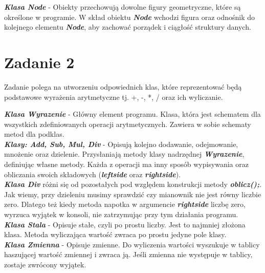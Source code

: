 \documentclass[12pt]{article}
\begin{document}
\textbf{\textit{Klasa Node}} -
Obiekty przechowują dowolne figury geometryczne, które są określone w programie. W skład obiektu \textbf{\textit{Node}} wchodzi figura oraz odnośnik do kolejnego elementu \textbf{\textit{Node}}, aby zachować porządek i ciągłość struktury danych.
\newpage

\section{Zadanie 2}
	
Zadanie polega na utworzeniu odpowiednich klas, które reprezentować będą podstawowe wyrażenia arytmetyczne tj. +, -, *, / oraz ich wyliczanie.


\textbf{\textit{Klasa Wyrazenie}} -
Główny element programu. Klasa, która jest schematem dla wszystkich zdefiniowanych operacji arytmetycznych. Zawiera w sobie schematy metod dla podklas.\\

\textbf{\textit{Klasy: Add, Sub, Mul, Div}} - Opisują kolejno dodawanie, odejmowanie, mnożenie oraz dzielenie. Przysłaniają metody klasy nadrzędnej \textbf{\textit{Wyrazenie}}, definiując własne metody. Każda z operacji ma inny sposób wypisywania oraz obliczania swoich składowych (\textbf{\textit{\textunderscore leftside}} oraz \textbf{\textit{\textunderscore rightside}}). \\

\textbf{\textit{Klasa Div}} różni się od pozostałych pod względem konstrukcji metody \textbf{\textit{oblicz();}}. Jak wiemy, przy dzieleniu musimy sprawdzić czy mianownik nie jest równy liczbie zero. Dlatego też kiedy metoda napotka w argumencie \textbf{\textit{\textunderscore rightside}} liczbę zero, wyrzuca wyjątek w konsoli, nie zatrzymując przy tym działania programu.\\

\textbf{\textit{Klasa Stala}} - Opisuje stałe, czyli po prostu liczby. Jest to najmniej złożona klasa. Metoda wyliczająca wartość zwraca po prostu jedyne pole klasy.\\

\textbf{\textit{Klasa Zmienna}} - Opisuje zmienne. Do wyliczenia wartości wyszukuje w tablicy haszującej wartość zmiennej i zwraca ją. Jeśli zmienna nie występuje w tablicy, zostaje zwrócony wyjątek.
	 
\end{document}
